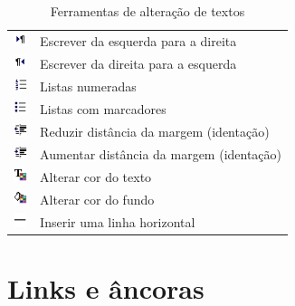 \begin{table}
\begin{center}
\begin{tabular}{m{0.5cm} m{6.0cm}}
  \includegraphics[width=0.4cm]{imagem/cap0/left_to_right.jpg} & Escrever da esquerda para a direita \\
  \includegraphics[width=0.4cm]{imagem/cap0/right_to_left.jpg} & Escrever da direita para a esquerda \\
  \includegraphics[width=0.4cm]{imagem/cap0/list_num.jpg} & Listas numeradas \\
  \includegraphics[width=0.4cm]{imagem/cap0/list_bullet.jpg} & Listas com marcadores \\
  \includegraphics[width=0.4cm]{imagem/cap0/indent_less.jpg} & Reduzir distância da margem (identação) \\
  \includegraphics[width=0.4cm]{imagem/cap0/indent_more.jpg} & Aumentar distância da margem (identação) \\
  \includegraphics[width=0.4cm]{imagem/cap0/ed_color_fg.jpg} & Alterar cor do texto \\
  \includegraphics[width=0.4cm]{imagem/cap0/ed_color_bg.jpg} & Alterar cor do fundo \\
  \includegraphics[width=0.4cm]{imagem/cap0/hr.jpg} & Inserir uma linha horizontal \\ \hline
 \end{tabular}
\caption{Ferramentas de alteração de textos}
\end{center}
\end{table}

\section{Links e âncoras}

